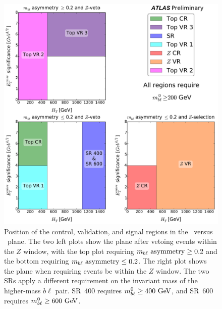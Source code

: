 \begin{figure}[ht]
  \centering
  \includegraphics[width=\textwidth]{figs/blstop/regions__met_sig__ht_plane.pdf}
  \caption[
    Position of the control, validation, and signal regions in the
    \METSIG\ versus \HT\ plane.
  ]{
    Position of the control, validation, and signal regions in the
    \METSIG\ versus \HT\ plane.
    The two left plots show the plane after vetoing events within
    the $Z$ window, with the top plot requiring $m_{b\ell}~\mathrm{asymmetry} \geq 0.2$ and the
    bottom requiring $m_{b\ell}~\mathrm{asymmetry} \leq 0.2$.
    The right plot shows the plane when requiring events be within the $Z$
    window.
    The two SRs apply a different requirement on the
    invariant mass of the higher-mass $b\ell$ pair. SR~400 requires
    $\MBL^{0} \geq 400 \GeV$, and SR~600 requires $\MBL^{0} \geq 600 \GeV$.
  }
  \label{fig:region_coverage}
\end{figure}

\FloatBarrier

